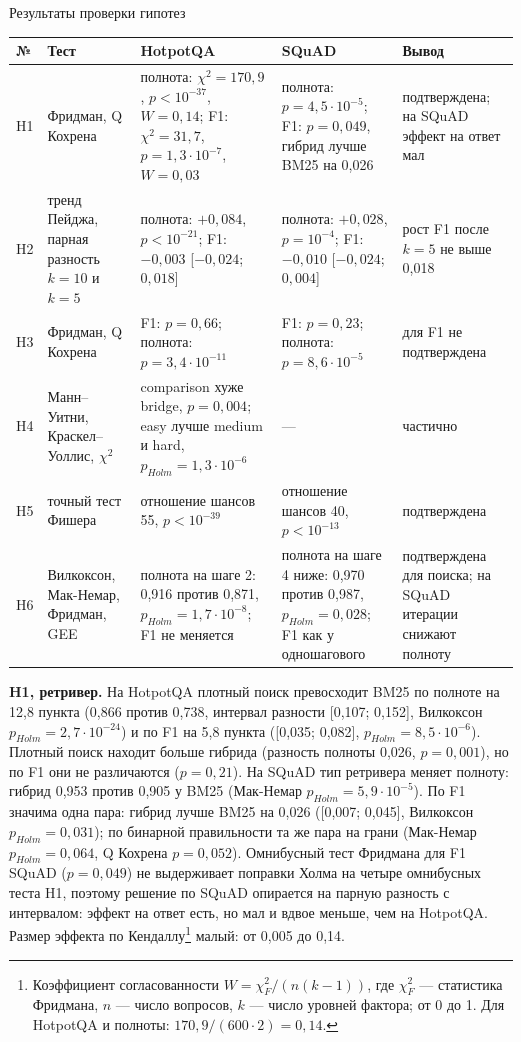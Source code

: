 \begin{gosttable}{Результаты проверки гипотез}\label{tab:hyp}
\begin{tabular}{>{\raggedright\arraybackslash}p{0.7cm}>{\raggedright\arraybackslash}p{2.8cm}>{\raggedright\arraybackslash}p{4.5cm}>{\raggedright\arraybackslash}p{3.5cm}>{\raggedright\arraybackslash}p{2.8cm}}
\toprule
№ & Тест & HotpotQA & SQuAD & Вывод \\
\midrule
H1 & Фридман, Q Кохрена & полнота: $\chi^2 = 170{,}9$, $p < 10^{-37}$, $W = 0{,}14$; F1: $\chi^2 = 31{,}7$, $p = 1{,}3 \cdot 10^{-7}$, $W = 0{,}03$ & полнота: $p = 4{,}5 \cdot 10^{-5}$; F1: $p = 0{,}049$, гибрид лучше BM25 на 0,026 & подтверждена; на SQuAD эффект на ответ мал \\
H2 & тренд Пейджа, парная разность $k{=}10$ и $k{=}5$ & полнота: $+0{,}084$, $p < 10^{-21}$; F1: $-0{,}003$ [$-0{,}024$; $0{,}018$] & полнота: $+0{,}028$, $p = 10^{-4}$; F1: $-0{,}010$ [$-0{,}024$; $0{,}004$] & рост F1 после $k{=}5$ не выше 0,018 \\
H3 & Фридман, Q Кохрена & F1: $p = 0{,}66$; полнота: $p = 3{,}4 \cdot 10^{-11}$ & F1: $p = 0{,}23$; полнота: $p = 8{,}6 \cdot 10^{-5}$ & для F1 не подтверждена \\
H4 & Манн--Уитни, Краскел--Уоллис, $\chi^2$ & comparison хуже bridge, $p = 0{,}004$; easy лучше medium и hard, $p_{Holm} = 1{,}3 \cdot 10^{-6}$ & --- & частично \\
H5 & точный тест Фишера & отношение шансов 55, $p < 10^{-39}$ & отношение шансов 40, $p < 10^{-13}$ & подтверждена \\
H6 & Вилкоксон, Мак-Немар, Фридман, GEE & полнота на шаге 2: 0,916 против 0,871, $p_{Holm} = 1{,}7 \cdot 10^{-8}$; F1 не меняется & полнота на шаге 4 ниже: 0,970 против 0,987, $p_{Holm} = 0{,}028$; F1 как у одношагового & подтверждена для поиска; на SQuAD итерации снижают полноту \\
\bottomrule
\end{tabular}
\end{gosttable}

\textbf{H1, ретривер.} На HotpotQA плотный поиск превосходит BM25 по полноте на 12,8 пункта (0,866 против 0,738, интервал разности [0,107; 0,152], Вилкоксон $p_{Holm} = 2{,}7 \cdot 10^{-24}$) и по F1 на 5,8 пункта ([0,035; 0,082], $p_{Holm} = 8{,}5 \cdot 10^{-6}$). Плотный поиск находит больше гибрида (разность полноты 0,026, $p = 0{,}001$), но по F1 они не различаются ($p = 0{,}21$). На SQuAD тип ретривера меняет полноту: гибрид 0,953 против 0,905 у BM25 (Мак-Немар $p_{Holm} = 5{,}9 \cdot 10^{-5}$). По F1 значима одна пара: гибрид лучше BM25 на 0,026 ([0,007; 0,045], Вилкоксон $p_{Holm} = 0{,}031$); по бинарной правильности та же пара на грани (Мак-Немар $p_{Holm} = 0{,}064$, Q Кохрена $p = 0{,}052$). Омнибусный тест Фридмана для F1 SQuAD ($p = 0{,}049$) не выдерживает поправки Холма на четыре омнибусных теста H1, поэтому решение по SQuAD опирается на парную разность с интервалом: эффект на ответ есть, но мал и вдвое меньше, чем на HotpotQA. Размер эффекта по Кендаллу\footnote{Коэффициент согласованности $W = \chi^2_F / (n(k-1))$, где $\chi^2_F$ --- статистика Фридмана, $n$ --- число вопросов, $k$ --- число уровней фактора; от 0 до 1. Для HotpotQA и полноты: $170{,}9 / (600 \cdot 2) = 0{,}14$.} малый: от 0,005 до 0,14.

